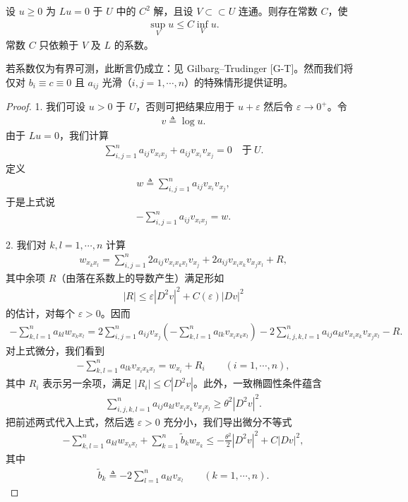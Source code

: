 \documentclass[../../main.tex]{subfiles}
\begin{document}
\begin{theorem}\label{theorem:ch06-Harnack}设 $u\geqslant 0$ 为 $Lu=0$ 于 $U$ 中的 $C^{2}$ 解，且设 $V\subset \subset U$ 连通。则存在常数 $C$，使
\begin{align}
\sup_{V}u\leqslant C\inf_{V}u.
\end{align}
常数 $C$ 只依赖于 $V$ 及 $L$ 的系数。
\end{theorem}

若系数仅为有界可测，此断言仍成立：见 Gilbarg--Trudinger [G-T]。然而我们将仅对 $b_{i}\equiv c\equiv 0$ 且 $a_{ij}$ 光滑（$i,j=1,\cdots,n$）的特殊情形提供证明。

\begin{proof}
1. 我们可设 $u>0$ 于 $U$，否则可把结果应用于 $u+\varepsilon$ 然后令 $\varepsilon\to 0^{+}$。令
\begin{align}
v\triangleq\log u.
\end{align}
由于 $Lu=0$，我们计算
\begin{align}
\sum_{i,j=1}^{n}a_{ij}v_{x_{i}x_{j}}+a_{ij}v_{x_{i}}v_{x_{j}}=0\quad\text{于}\ U.
\end{align}
定义
\begin{align}
w\triangleq\sum_{i,j=1}^{n}a_{ij}v_{x_{i}}v_{x_{j}},
\end{align}
于是上式说
\begin{align}
-\sum_{i,j=1}^{n}a_{ij}v_{x_{i}x_{j}}=w.
\end{align}

2. 我们对 $k,l=1,\cdots,n$ 计算
\begin{align*}
w_{x_{k}x_{l}}=\sum_{i,j=1}^{n}2a_{ij}v_{x_{i}x_{k}x_{l}}v_{x_{j}}+2a_{ij}v_{x_{i}x_{k}}v_{x_{j}x_{l}}+R,
\end{align*}
其中余项 $R$（由落在系数上的导数产生）满足形如
\begin{align}
|R|\leqslant\varepsilon|D^{2}v|^{2}+C(\varepsilon)|Dv|^{2}
\end{align}
的估计，对每个 $\varepsilon>0$。因而
\begin{align}
-\sum_{k,l=1}^{n}a_{kl}w_{x_{k}x_{l}}
=2\sum_{i,j=1}^{n}a_{ij}v_{x_{j}}\left(-\sum_{k,l=1}^{n}a_{lk}v_{x_{i}x_{k}x_{l}}\right)
-2\sum_{i,j,k,l=1}^{n}a_{ij}a_{kl}v_{x_{i}x_{k}}v_{x_{j}x_{l}}-R.
\end{align}
对上式微分，我们看到
\begin{align}
-\sum_{k,l=1}^{n}a_{lk}v_{x_{i}x_{k}x_{l}}=w_{x_{i}}+R_{i}\qquad (i=1,\cdots,n),
\end{align}
其中 $R_{i}$ 表示另一余项，满足 $|R_{i}|\leqslant C|D^{2}v|$。此外，一致椭圆性条件蕴含
\begin{align}
\sum_{i,j,k,l=1}^{n}a_{ij}a_{kl}v_{x_{i}x_{k}}v_{x_{j}x_{l}}\geqslant\theta^{2}|D^{2}v|^{2}.
\end{align}
把前述两式代入上式，然后选 $\varepsilon>0$ 充分小，我们导出微分不等式
\begin{align}\label{align:ch06-Harnack微分不等式}
-\sum_{k,l=1}^{n}a_{kl}w_{x_{k}x_{l}}+\sum_{k=1}^{n}\widetilde{b}_{k}w_{x_{k}}\leqslant-\frac{\theta^{2}}{2}|D^{2}v|^{2}+C|Dv|^{2},
\end{align}
其中
\begin{align}
\widetilde{b}_{k}\triangleq-2\sum_{l=1}^{n}a_{kl}v_{x_{l}}\qquad (k=1,\cdots,n).
\end{align}


\end{proof}
\end{document}
